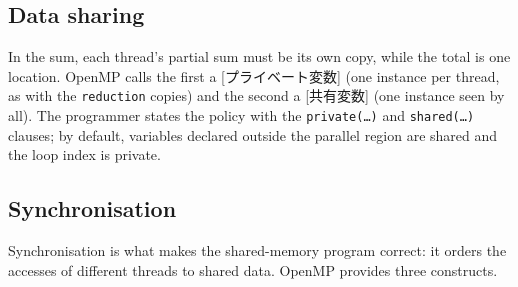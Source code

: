 \documentclass[../main.tex]{subfiles}
\begin{document}
\subsection{Data sharing}

In the sum, each thread's partial sum must be its own copy, while the
total is one location.  OpenMP calls the first a
[プライベート変数] (one instance per thread, as
with the \texttt{reduction} copies) and the second a
[共有変数] (one instance seen by all).  The
programmer states the policy with the \texttt{private(\ldots)} and
\texttt{shared(\ldots)} clauses; by default, variables declared outside the
parallel region are shared and the loop index is
private.

\subsection{Synchronisation}

Synchronisation is what makes the shared-memory program correct: it orders
the accesses of different threads to shared data.  OpenMP provides three
constructs.
\end{document}
